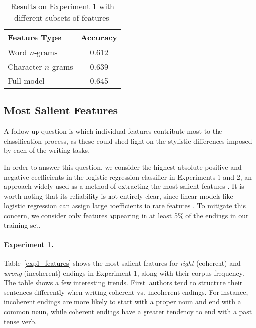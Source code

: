 \documentclass[11pt,a4paper]{article}
\newcommand{\tabref}[1]{Table~\ref{#1}}
\begin{document}
\begin{table}[!t]
\begin{center}
\begin{tabular}{|l|c|} \hline
{\bf Feature Type} & {\bf Accuracy}\\ \hline
Word $n$-grams & 0.612 \\ \hline
Character $n$-grams & 0.639 \\ \hline
Full model & 0.645 \\ \hline

\end{tabular}
\end{center}
\caption{\label{subgroups}
Results on Experiment 1 with different subsets of features.
}
\end{table}

\subsection{Most Salient Features}
A follow-up question is which individual features contribute most to the classification process,
as these could shed light on the stylistic differences imposed by each of the writing tasks.

In order to answer this question, we consider the highest absolute
positive and negative coefficients in the logistic regression
classifier in Experiments 1 and 2, an approach widely used  as a
method of extracting the most salient features
\cite{Nguyen:2013,Burke:2013,Brooks:2013}. It is worth noting
  that its reliability is not entirely clear, since linear models like
  logistic regression can assign large coefficients to rare features \cite{Yano:2012}.
To mitigate this concern, we consider only features appearing in at least 5\% of the endings in our training set. 

\paragraph{Experiment 1.}
\tabref{exp1_features} shows the most salient features for {\it right} (coherent) and {\it wrong} (incoherent) endings in Experiment 1,
along with their corpus frequency. 
The table shows a few interesting trends. 
First, authors tend to structure their sentences differently when writing {coherent}  vs.~{incoherent} endings.
For instance, {incoherent} endings are more likely to start with a proper noun and end with a common noun, 
while coherent endings have a greater tendency to end with a past tense verb.
\end{document}
